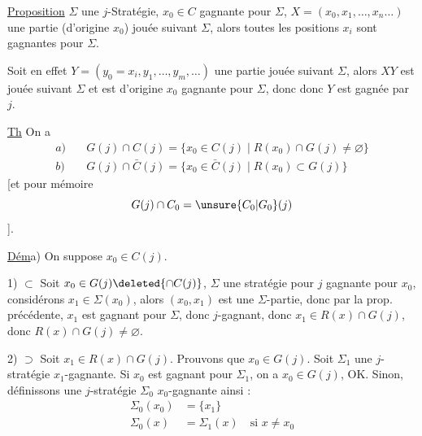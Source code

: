\uline{Proposition}\quad {} $\Sigma$ une $j$-Stratégie, $x_0\in C$  gagnante pour $\Sigma$, $X=(x_0,x_1,\ldots,x_n\ldots)$ une partie (d'origine $x_0$) jouée suivant $\Sigma$, alors toutes les positions $x_i$ sont gagnantes pour $\Sigma$.

Soit en effet $Y=(y_0=x_i,y_1,\ldots,y_m,\ldots)$ une partie  jouée suivant $\Sigma$,  alors $XY$ est jouée suivant $\Sigma$ et est d'origine $x_0$ gagnante pour $\Sigma$, donc  donc $Y$ est gagnée par $j$.

\uline{Th} On a 
\[
\begin{aligned}
a)\quad&G(j)\cap C(j)=\{x_0\in C(j)\mid R(x_0)\cap G(j)\ne\varnothing\}\\
b)\quad&G(j)\cap\bar C(j)=\{x_0\in\bar C(j)\mid R(x_0)\subset G(j)\}
\end{aligned}
\]
[et pour mémoire
\[
G(j)\cap C_0=\unsure{C_0|G_0}(j)
\]
].

\uline{Dém}\quad a) On suppose $x_0\in C(j)$.

 1) $\subset$ Soit $x_0\in G(j)\deleted{\cap C(j)}$,  $\Sigma$ une stratégie pour $j$ gagnante pour $x_0$, considérons $x_1\in\Sigma(x_0)$, alors $(x_0,x_1)$ est une $\Sigma$-partie, donc par la prop. précédente, $x_1$ est gagnant pour $\Sigma$, donc $j$-gagnant, donc $x_1\in R(x)\cap G(j)$, donc $R(x)\cap G(j)\ne\varnothing$.

2) $\supset$ Soit $x_1\in R(x)\cap G(j)$. Prouvons que $x_0\in G(j)$.  Soit $\Sigma_1$ une $j$-stratégie $x_1$-gagnante. Si $x_0$ est gagnant pour $\Sigma_1$, on a $x_0\in G(j)$, OK. Sinon, définissons une $j$-stratégie $\Sigma_0$ $x_0$-gagnante ainsi :
\[
\begin{aligned}
\Sigma_0(x_0)&=\{x_1\}\\
\Sigma_0(x)&=\Sigma_1(x)\quad\text{si }x\ne x_0
\end{aligned}
\]
